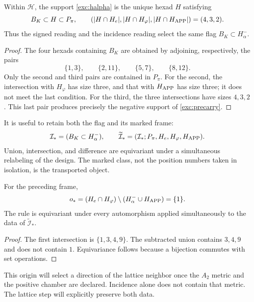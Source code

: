 

\begin{proposition}
\label{exc:selector-bandera}
Within $\mathcal H$, the support \eqref{exc:halpha} is the unique hexad
$H$ satisfying
\[
 B_K\subset H\subset P_\pi,
 \qquad
 (|H\cap H_e|,|H\cap H_\varphi|,|H\cap H_{\rm APP}|)=(4,3,2).
\]
Thus the signed reading and the incidence reading select the same
flag $B_K\subset H^-_\alpha$.
\end{proposition}

\begin{proof}
The four hexads containing $B_K$ are obtained by adjoining,
respectively, the pairs
\[
 \{1,3\},\qquad\{2,11\},\qquad\{5,7\},\qquad\{8,12\}.
\]
Only the second and third pairs are contained in $P_\pi$. For the
second, the intersection with $H_\varphi$ has size three, and that with
$H_{\rm APP}$ has size three; it does not meet the last condition. For the
third, the three intersections have sizes $4,3,2$. This last pair
produces precisely the negative support of \eqref{exc:precarry}.
\end{proof}

It is useful to retain both the flag and its marked frame:
\[
 \mathcal I_*=(B_K\subset H^-_\alpha),\qquad
 \widetilde{\mathcal I}_*
   =(\mathcal I_*;P_\pi,H_e,H_\varphi,H_{\rm APP}).
\]
Union, intersection, and difference are equivariant
under a simultaneous relabeling of the design. The marked class, not the
position numbers taken in isolation, is the transported object.

\begin{lemma}
\label{exc:origen}
For the preceding frame,
\[
 o_*=(H_e\cap H_\varphi)
           \setminus(H^-_\alpha\cup H_{\rm APP})=\{1\}.
\]
The rule is equivariant under every automorphism applied simultaneously
to the data of $\widetilde{\mathcal I}_*$.
\end{lemma}

\begin{proof}
The first intersection is $\{1,3,4,9\}$. The subtracted union
contains $3,4,9$ and does not contain $1$. Equivariance follows because a
bijection commutes with set operations.
\end{proof}

This origin will select a direction of the lattice neighbor once the
$A_2$ metric and the positive chamber are declared. Incidence alone
does not contain that metric. The lattice step will explicitly preserve
both data.

